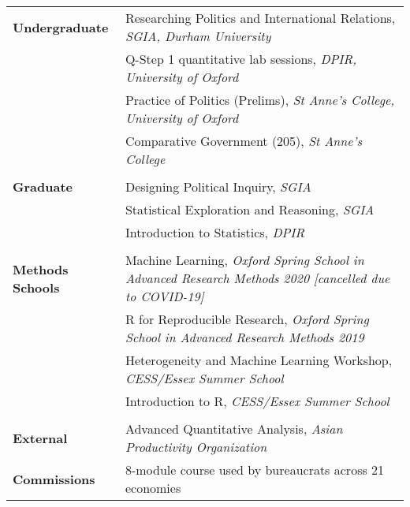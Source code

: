\documentclass[11pt, a4paper]{article}
\begin{document}
  \begin{tabular}{p{}|p{}}
     \textbf{Undergraduate} 
      & Researching Politics and International Relations, \textit{SGIA, Durham University}\\
      &  Q-Step 1 quantitative lab sessions, \textit{DPIR, University of Oxford} \\
      & Practice of Politics (Prelims), \textit{St Anne's College, University of Oxford}\\
      & Comparative Government (205), \textit{St Anne's College} \\
      & \\
      \textbf{Graduate} 
      & Designing Political Inquiry, \textit{SGIA} \\
      & Statistical Exploration and Reasoning, \textit{SGIA} \\
      &  Introduction to Statistics, \textit{DPIR} \\
      & \\
      \textbf{Methods Schools} & Machine Learning, \textit{Oxford Spring School in Advanced Research Methods 2020 [cancelled due to COVID-19]} \\
      & R for Reproducible Research, \textit{Oxford Spring School in Advanced Research Methods 2019} \\
      & Heterogeneity and Machine Learning Workshop, \textit{CESS/Essex Summer School} \\
      & Introduction to R, \textit{CESS/Essex Summer School} \\
      & \\
      \textbf{External} 
      & Advanced Quantitative Analysis, \textit{Asian Productivity Organization} \\
      \textbf{Commissions} & 8-module course used by bureaucrats across 21 economies \\
 \end{tabular}

\end{document}
